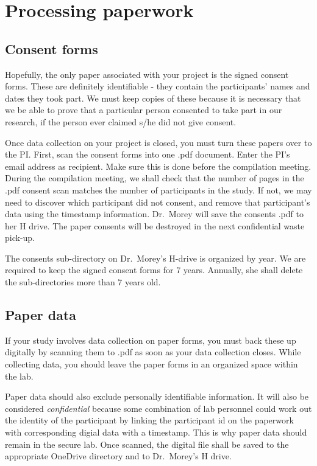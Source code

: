 \documentclass[
  12pt,
]{book}
\begin{document}
\section{Processing paperwork}\label{processing-paperwork}

\subsection{Consent forms}\label{consent-forms}

Hopefully, the only paper associated with your project is the signed consent forms. These are definitely identifiable - they contain the participants' names and dates they took part. We must keep copies of these because it is necessary that we be able to prove that a particular person consented to take part in our research, if the person ever claimed s/he did not give consent.

Once data collection on your project is closed, you must turn these papers over to the PI. First, scan the consent forms into one .pdf document. Enter the PI's email address as recipient. Make sure this is done before the compilation meeting. During the compilation meeting, we shall check that the number of pages in the .pdf consent scan matches the number of participants in the study. If not, we may need to discover which participant did not consent, and remove that participant's data using the timestamp information. Dr.~Morey will save the consents .pdf to her H drive. The paper consents will be destroyed in the next confidential waste pick-up.

The consents sub-directory on Dr.~Morey's H-drive is organized by year. We are required to keep the signed consent forms for 7 years. Annually, she shall delete the sub-directories more than 7 years old.

\subsection{Paper data}\label{paper-data}

If your study involves data collection on paper forms, you must back these up digitally by scanning them to .pdf as soon as your data collection closes. While collecting data, you should leave the paper forms in an organized space within the lab.

Paper data should also exclude personally identifiable information. It will also be considered \emph{confidential} because some combination of lab personnel could work out the identity of the participant by linking the participant id on the paperwork with corresponding digial data with a timestamp. This is why paper data should remain in the secure lab. Once scanned, the digital file shall be saved to the appropriate OneDrive directory and to Dr.~Morey's H drive.
\end{document}
